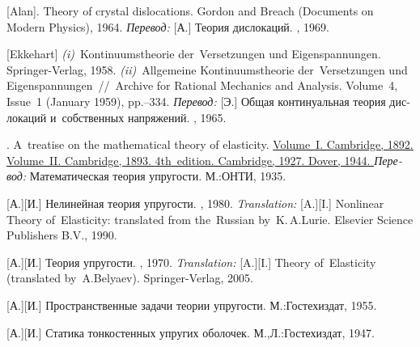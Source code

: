 \begin{thebibliography}{123}
\begin{otherlanguage}{russian}
[Alan].
Theory of crystal dislocations.
Gordon and Breach
(Documents on Modern Physics),
1964.
\emph{Перевод:}
[А.]
Теория дислокаций.
\mirpublisher, 1969.

[Ekkehart] \emph{(i)}~Kontinuumstheorie der~Versetzungen und Eigen\-spannung\-en. Springer\hbox{-}Verlag, 1958. 
\emph{(ii)}~Allgemeine Kontinuumstheorie der~Versetzungen und Eigen\-span\-nung\-en~//~Archive for Rational Mechanics and Analysis. Volume~4, Issue~1 (January 1959), pp.\hbox{--}334.
\emph{Перевод:} [Э.] Общая континуальная теория дислокаций и~собственных напряжений. \mirpublisher, 1965. 

.
A~treatise on the mathematical theory of elasticity.
\href{https://hal.archives-ouvertes.fr/hal-01307751/document}{
Volume~I.
Cambridge, 1892.
}
\href{https://archive.org/details/in.ernet.dli.2015.503659}{
Volume~II.
Cambridge, 1893.
}
\href{https://archive.org/details/in.ernet.dli.2015.462644/page/n1}{
4th~edition.
Cambridge, 1927.
Dover, 1944.
}
\emph{Перевод:}
Математическая теория упругости.
М.:\;ОНТИ,
1935.

[А.][И.] Нелинейная теория упругости. \naukapublisher, 1980. 
\emph{Translation:}
[A.][I.] Nonlinear Theory of~Elasticity: translated from the~Russian by~K.\,A.\;Lurie. Elsevier Science Publishers B.\hspace{.1ex}V\hspace{-0.2ex}., 1990. 

[А.][И.]
Теория упругости.
\naukapublisher, 1970.
\emph{Translation:}
[A.][I.]
Theory of~Elasticity (translated by~A.\:Belyaev).
Springer-Verlag, 2005.

[А.][И.]
Пространственные задачи теории упругости.
М.:\;Гос\-тех\-издат, 1955.

[А.][И.]
Статика тонкостенных упругих оболочек.
М.,\:Л.:\;Гос\-тех\-издат, 1947.


\end{otherlanguage}
\end{thebibliography}
